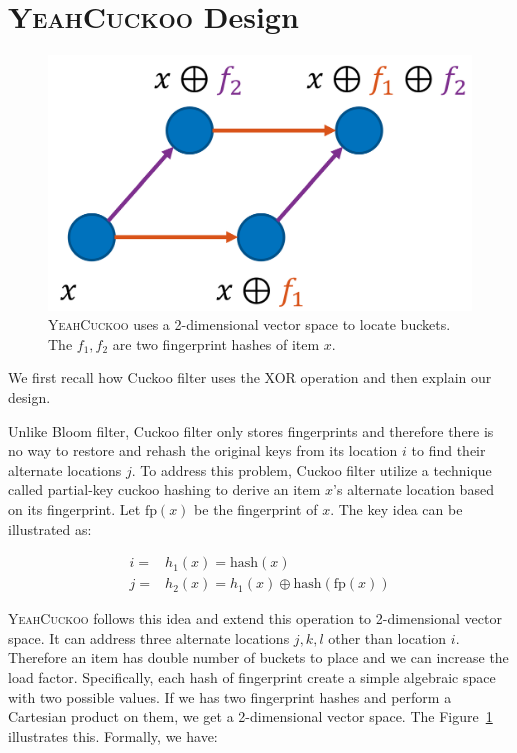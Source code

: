 \documentclass[11pt]{IEEEtran}
\newcommand{\sys}{\textsc{YeahCuckoo}\xspace}
\begin{document}
\section{\sys Design}

\begin{figure}
\centering
\includegraphics[width=0.7\linewidth]{design.png}
\caption{\sys uses a 2-dimensional vector space to locate buckets. The $f_1,f_2$ are two fingerprint hashes of item $x$.}
\label{design}
\end{figure}

We first recall how Cuckoo filter uses the XOR operation and then explain our design. 

Unlike Bloom filter, Cuckoo filter only stores fingerprints and therefore there is no way to restore and rehash the original keys from its location $i$ to find their alternate locations $j$. To address this problem, Cuckoo filter utilize a technique called partial-key cuckoo hashing to derive an item $x$'s alternate location based on its fingerprint. Let $\text{fp}(x)$ be the fingerprint of $x$. The key idea can be illustrated as:

\begin{equation*}
\begin{split}
i =& h_1(x) = \text{hash}(x) \\
j =& h_2(x) = h_1(x) \oplus \text{hash}(\text{fp}(x))
\end{split}
\end{equation*}

\sys follows this idea and extend this operation to 2-dimensional vector space. It can address three alternate locations $j, k, l$ other than location $i$. Therefore an item has double number of buckets to place and we can increase the load factor. Specifically, each hash of fingerprint create a simple algebraic space with two possible values. If we has two fingerprint hashes and perform a Cartesian product on them, we get a 2-dimensional vector space. The Figure~\ref{design} illustrates this. Formally, we have:
\end{document}
